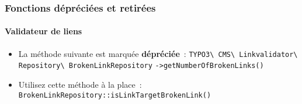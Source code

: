
\begin{frame}[fragile]
	\frametitle{Fonctions dépréciées et retirées}
\framesubtitle{Validateur de liens}

\begin{itemize}
	\item La méthode suivante est marquée \textbf{dépréciée}~:
	\newline\newline
		\smaller
			\texttt{TYPO3\textbackslash
				CMS\textbackslash
				Linkvalidator\textbackslash
				Repository\textbackslash
				BrokenLinkRepository}\newline
			\texttt{->getNumberOfBrokenLinks()}\normalsize\newline

	\item Utilisez cette méthode à la place~:\newline
		\small\texttt{BrokenLinkRepository::isLinkTargetBrokenLink()}\normalsize

	\end{itemize}

\end{frame}


